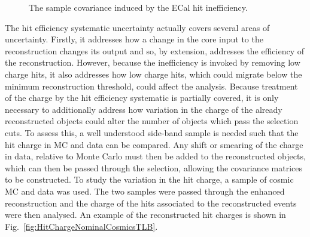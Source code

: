 \begin{figure}%
  \centering
  \caption{The sample covariance induced by the ECal hit inefficiency.}
  \label{fig:ECalThresholdCovarianceMatrices}
\end{figure}
\newline
\newline
The hit efficiency systematic uncertainty actually covers several areas of uncertainty.  Firstly, it addresses how a change in the core input to the reconstruction changes its output and so, by extension, addresses the efficiency of the reconstruction.  However, because the inefficiency is invoked by removing low charge hits, it also addresses how low charge hits, which could migrate below the minimum reconstruction threshold, could affect the analysis.  Because treatment of the charge by the hit efficiency systematic is partially covered, it is only necessary to additionally address how variation in the charge of the already reconstructed objects could alter the number of objects which pass the selection cuts.  To assess this, a well understood side-band sample is needed such that the hit charge in MC and data can be compared.  Any shift or smearing of the charge in data, relative to Monte Carlo must then be added to the reconstructed objects, which can then be passed through the selection, allowing the covariance matrices to be constructed.  To study the variation in the hit charge, a sample of cosmic MC and data was used.  The two samples were passed through the enhanced reconstruction and the charge of the hits associated to the reconstructed events were then analysed.  An example of the reconstructed hit charges is shown in Fig.~\ref{fig:HitChargeNominalCosmicsTLB}.  
